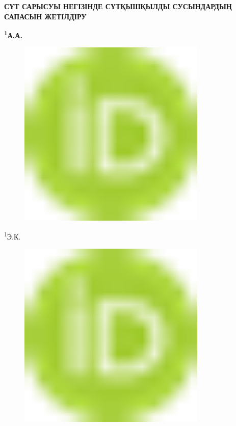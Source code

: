 
{\bfseries СҮТ САРЫСУЫ НЕГІЗІНДЕ СҮТҚЫШҚЫЛДЫ СУСЫНДАРДЫҢ САПАСЫН ЖЕТІЛДІРУ}

{\bfseries \textsuperscript{1}А.А.
\begin{figure}[H]
	\centering
	\includegraphics[width=0.8\textwidth]{media/pish4/image1}
	\caption*{}
\end{figure}

\textsuperscript{1}Э.К.
\begin{figure}[H]
	\centering
	\includegraphics[width=0.8\textwidth]{media/pish4/image1}
	\caption*{}
\end{figure}

}
